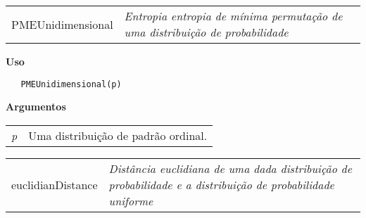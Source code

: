 \documentclass[12pt,letterpaper]{article}
\begin{document}

\hrulefill   

\begin{table}[!h]
\begin{center}
\begin{tabularx}{\textwidth}{ X X}
\hspace{0.5cm} PMEUnidimensional & \textit{Entropia entropia de mínima permutação de uma distribuição de probabilidade}\\
\end{tabularx}
\end{center}
\end{table} 

\vspace{-0.5cm}

\hrulefill  

\vspace{0.5cm}

\textbf{Uso}

\begin{lstlisting}
   PMEUnidimensional(p)
\end{lstlisting}

\vspace{0.5cm}

\textbf{Argumentos}

\begin{table}[!h]
\begin{center}
\begin{tabularx}{\textwidth}{X X}
\hspace{0.5cm} \textit{p} & Uma distribuição de padrão ordinal.\\
\end{tabularx}
\end{center}
\end{table} 
\newpage

\hrulefill   

\begin{table}[!h]
\begin{center}
\begin{tabularx}{\textwidth}{ X X}
\hspace{0.5cm} euclidianDistance & \textit{Distância euclidiana de uma dada distribuição de probabilidade e a distribuição de probabilidade uniforme}\\
\end{tabularx}
\end{center}
\end{table} 
\end{document}
